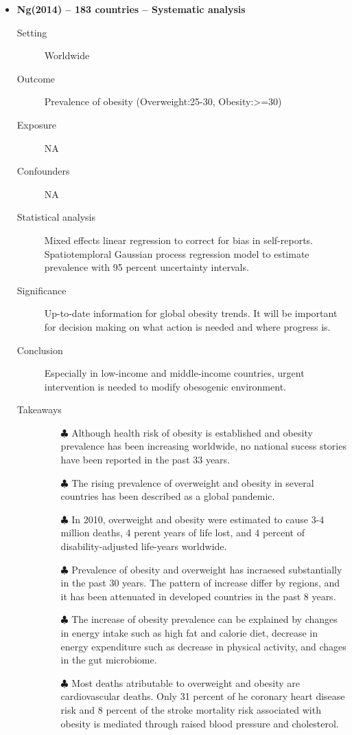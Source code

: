 \documentclass{article}
\begin{document}
\begin{itemize}
\item{\bf Ng(2014) -- 183 countries -- Systematic analysis} 
		\begin{description}
			\item[Setting] Worldwide 
			\item[Outcome] Prevalence of obesity (Overweight:25-30, Obesity:>=30) 
			\item[Exposure] NA 
			\item[Confounders] NA 
			\item[Statistical analysis] Mixed effects linear regression to correct for bias in self-reports. Spatiotemploral Gaussian process regression model to estimate prevalence with 95 percent uncertainty intervals. 
			\item[Significance] Up-to-date information for global obesity trends. It will be important for decision making on what action is needed and where progress is. 
			\item[Conclusion] Especially in low-income and middle-income countries, urgent intervention is needed to modify obesogenic environment. 
			\item[Takeaways] \mbox{}\par
				\begin{itemize}
					\item[$\clubsuit$] Although health risk of obesity is established and obesity prevalence has been increasing worldwide, no national sucess stories have been reported in the past 33 years. 
					\item[$\clubsuit$] The rising prevalence of overweight and obesity in several countries has been described as a global pandemic.  
					\item[$\clubsuit$] In 2010, overweight and obesity were estimated to cause 3-4 million deaths, 4 perent years of life lost, and 4 percent of disability-adjusted life-years worldwide. 
					\item[$\clubsuit$] Prevalence of obesity and overweight has incraesed substantially in the past 30 years. The pattern of increase differ by regions, and it has been attenuated in developed countries in the past 8 years.
					\item[$\clubsuit$] The increase of obesity prevalence can be explained by changes in energy intake such as high fat and calorie diet, decrease in energy expenditure such as decrease in physical activity, and chages in the gut microbiome.
					\item[$\clubsuit$] Most deaths atributable to overweight and obesity are cardiovascular deaths. Only 31 percent of he coronary heart disease risk and 8 percent of the stroke mortality risk associated with obesity is mediated through raised blood pressure and cholesterol.
				\end{itemize} 
		\end{description}
		

\end{itemize}
\end{document}
